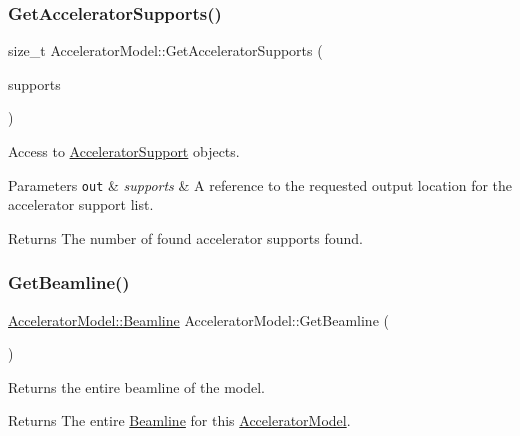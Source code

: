 \subsubsection{\texorpdfstring{Get\+Accelerator\+Supports()}{GetAcceleratorSupports()}}
{\footnotesize\ttfamily size\+\_\+t Accelerator\+Model\+::\+Get\+Accelerator\+Supports (\begin{DoxyParamCaption}\item[{Accelerator\+Support\+List \&}]{supports }\end{DoxyParamCaption})}

Access to \hyperlink{classAcceleratorSupport}{Accelerator\+Support} objects. 
\begin{DoxyParams}[1]{Parameters}
\mbox{\tt out}  & {\em supports} & A reference to the requested output location for the accelerator support list. \\
\hline
\end{DoxyParams}
\begin{DoxyReturn}{Returns}
The number of found accelerator supports found. 
\end{DoxyReturn}
\mbox{\label{classAcceleratorModel_ac5cc18e6817b0ca55c1df440af3fcec8}} 
\subsubsection{\texorpdfstring{Get\+Beamline()}{GetBeamline()}\hspace{0.1cm}{\footnotesize\ttfamily [1/3]}}
{\footnotesize\ttfamily \hyperlink{classAcceleratorModel_1_1Beamline}{Accelerator\+Model\+::\+Beamline} Accelerator\+Model\+::\+Get\+Beamline (\begin{DoxyParamCaption}{ }\end{DoxyParamCaption})}

Returns the entire beamline of the model. \begin{DoxyReturn}{Returns}
The entire \hyperlink{classAcceleratorModel_1_1Beamline}{Beamline} for this \hyperlink{classAcceleratorModel}{Accelerator\+Model}. 
\end{DoxyReturn}
\mbox{\label{classAcceleratorModel_a4fa60bb81f95cd89b3b990ecd07fd030}} 
